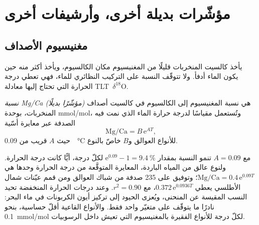 \section{مؤشّرات بديلة أخرى، وأرشيفات أخرى}\label{sec:b2:climate-proxies:others}

\subsection*{مغنيسيوم الأصداف}

يأخذ كالسيت المنخربات قليلًا من المغنيسيوم مكان الكالسيوم، ويأخذ أكثر منه حين
يكون الماء أدفأ. ولا تتوقّف النسبة على التركيب النظائري للماء، فهي
تعطي درجة الحرارة التي تحتاج إليها معادلة \mbox{\textdir TLT $\delta^{18}$O}.

\begin{definition}\label{def:b2:climate-proxies:mgca}
\emph{نسبة Mg/Ca (مؤشّرًا بديلًا)} هي نسبة المغنيسيوم إلى الكالسيوم في
كالسيت أصداف المنخربات، بوحدة \unit{mmol/mol}، وتُستعمل مقياسًا لدرجة حرارة
الماء الذي نمت فيه الصدفة عبر معايرة أسّية
\[
  \text{Mg/Ca} = B\,\mathrm{e}^{A T},
\]
حيث $A$ قريب من \qty{0.09}{\per\celsius} للأنواع العوالق و$B$ خاصّ بالنوع.
\end{definition}

مع $A = 0.09$ تنمو النسبة بمقدار $\mathrm{e}^{0.09} - 1 = \qty{9.4}{\percent}$ لكلّ درجة،
أيًّا كانت درجة الحرارة. ولنوع عالق من المياه الباردة، المعايرة المتوقَّعة من
درجة الحرارة وحدها هي $\text{Mg/Ca} = 0.4\,\mathrm{e}^{0.09T}$؛ وتوفيق على 235 صدفة من شباك
العوالق ومن قمم عيّنات شمال الأطلسي يعطي $0.372\,\mathrm{e}^{0.0936T}$، مع $r^2 = 0.90$.
وعند درجات الحرارة المنخفضة تحيد النسب المقيسة عن المنحنى، ويُعزى الحيود إلى
تركيز أيون الكربونات في ماء البحر:  نادرًا ما يتوقّف على متغيّر واحد فقط.
والأنواع القاعية أقلّ حساسية، بنحو \qty{0.1}{mmol/mol} لكلّ درجة للأنواع الفقيرة بالمغنيسيوم
التي تعيش داخل الرسوبيات.

